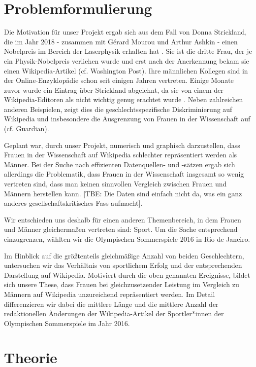 \documentclass[11pt]{article}
\begin{document}
\section {Problemformulierung}

Die Motivation für unser Projekt ergab sich aus dem Fall von Donna Strickland, die im Jahr 2018 - zusammen mit Gérard Mourou und Arthur Ashkin - einen Nobelpreis im Bereich der Laserphysik erhalten hat \cite{nobelprize}. Sie ist die dritte Frau, der je ein Physik-Nobelpreis verliehen wurde und erst nach der Anerkennung bekam sie einen Wikipedia-Artikel (cf. Washington Post). Ihre männlichen Kollegen sind in der Online-Enzyklopädie schon seit einigen Jahren vertreten. Einige Monate zuvor wurde ein Eintrag über Strickland abgelehnt, da sie von einem der Wikipedia-Editoren als nicht wichtig genug erachtet wurde \cite{stricklandWiki}. Neben zahlreichen anderen Beispielen, zeigt dies die geschlechtsspezifische Diskriminierung auf Wikipedia und insbesondere die Ausgrenzung von Frauen in der Wissenschaft auf (cf. Guardian).

Geplant war, durch unser Projekt, numerisch und graphisch darzustellen, dass Frauen in der Wissenschaft auf Wikipedia schlechter repräsentiert werden als Männer. Bei der Suche nach effizienten Datenquellen- und -sätzen ergab sich allerdings die Problematik, dass Frauen in der Wissenschaft insgesamt so wenig vertreten sind, dass man keinen sinnvollen Vergleich zwischen Frauen und Männern herstellen kann. [TBE: Die Daten sind einfach nicht da, was ein ganz anderes gesellschaftskritisches Fass aufmacht]. 

Wir entschieden uns deshalb für einen anderen Themenbereich, in dem Frauen und Männer gleichermaßen vertreten sind: Sport. Um die Sache entsprechend einzugrenzen, wählten wir die Olympischen Sommerspiele 2016 in Rio de Janeiro. 

Im Hinblick auf die größtenteils gleichmäßige Anzahl von beiden Geschlechtern, untersuchen wir das Verhältnis von sportlichem Erfolg und der entsprechenden Darstellung auf Wikipedia. Motiviert durch die oben genannten Ereignisse, bildet sich unsere These, dass Frauen bei gleichzusetzender Leistung im Vergleich zu Männern auf Wikipedia unzureichend repräsentiert werden. Im Detail differenzieren wir dabei die mittlere Länge und die mittlere Anzahl der redaktionellen Änderungen der Wikipedia-Artikel der Sportler*innen der Olympischen Sommerspiele im Jahr 2016.

\section*{Theorie}
\label{intro}
\end{document}
